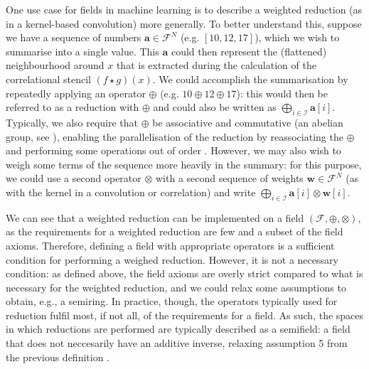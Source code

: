 \documentclass[11pt]{article} %
\begin{document}
One use case for fields in machine learning is to describe a weighted reduction (as in a kernel-based convolution) more generally. To better understand this, suppose we have a sequence of numbers $\mathbf{a} \in \mathcal{F}^N$  (e.g. $[10, 12, 17]$), which we wish to summarise into a single value. This $\mathbf{a}$ could then represent the (flattened) neighbourhood around $x$ that is extracted during the calculation of the correlational stencil $(f \star g)(x)$. We could accomplish the summarisation by repeatedly applying an operator $\oplus$ (e.g. $10 \oplus 12 \oplus 17$): this would then be referred to as a reduction with $\oplus$ and could also be written as $\bigoplus_{i\in \mathcal{I}}\mathbf{a}[i]$. Typically, we also require that $\oplus$ be associative and commutative (an abelian group, see ), enabling the parallelisation of the reduction by reassociating the $\oplus$ and performing some operations out of order \cite{ppad}. However, we may also wish to weigh some terms of the sequence more heavily in the summary: for this purpose, we could use a second operator $\otimes$ with a second sequence of weights $\mathbf{w} \in \mathcal{F}^N$ (as with the kernel in a convolution or correlation) and write $\bigoplus_{i\in \mathcal{I}}\mathbf{a}[i] \otimes \mathbf{w}[i]$. 

We can see that a weighted reduction can be implemented on a field $(\mathcal{F}, \oplus, \otimes)$, as the requirements for a weighted reduction are few and a subset of the field axioms. Therefore, defining a field with appropriate operators is a sufficient condition for performing a weighed reduction. However, it is not a necessary condition: as defined above, the field axioms are overly strict compared to what is necessary for the weighted reduction, and we could relax some assumptions to obtain, e.g., a semiring. In practice, though, the operators typically used for reduction fulfil most, if not all, of the requirements for a field. As such, the spaces in which reductions are performed are typically described as a semifield: a field that does not neccesarily have an additive inverse, relaxing assumption 5 from the previous definition \cite{bellaardaxiomatic}.
\end{document}

